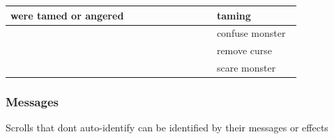 \begin{longtable}{|>{\RaggedRight}p{0.66675\linewidth}|>{\RaggedRight}p{0.27611\linewidth}|}
were tamed or angered&\hspace*{0pt}\ignorespaces{}\hspace*{0pt}taming\\ \hline \multirow{3}{0.47143\linewidth}{\cellcolor{pink}\hspace*{0pt}\ignorespaces{}\hspace*{0pt}Never}&\hspace*{0pt}\ignorespaces{}\hspace*{0pt}confuse monster\\* \cline{2-2} \multicolumn{1}{|c|}{}&\hspace*{0pt}\ignorespaces{}\hspace*{0pt}remove curse\\* \cline{2-2} \multicolumn{1}{|c|}{}&\hspace*{0pt}\ignorespaces{}\hspace*{0pt}scare monster\\ \hline 
\end{longtable}

\subsubsection{Messages}
\label{14}
Scrolls that don\textquotesingle{}t auto-{}identify can be identified by their messages or effects




